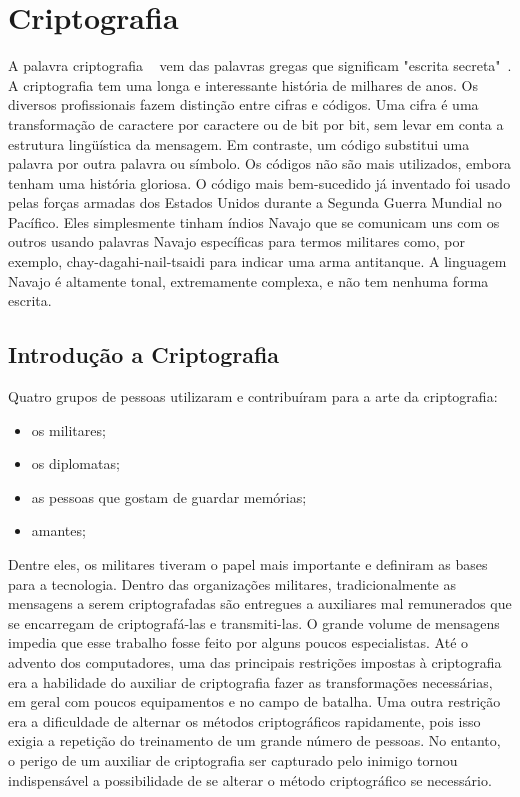 \chapter{Criptografia}


A palavra criptografia ~\cite{tanenbaum} vem das palavras gregas que significam "escrita secreta"~. A criptografia tem  uma longa e interessante história de milhares de anos. 
Os diversos  profissionais fazem distinção entre cifras e códigos. Uma cifra é uma transformação de caractere por caractere ou de bit por bit, sem levar em conta a estrutura lingüística da mensagem. Em contraste, um código substitui uma palavra por outra palavra ou símbolo. Os códigos não são mais utilizados, embora tenham uma história gloriosa. O código mais bem-sucedido já inventado foi usado pelas forças armadas dos Estados Unidos durante a Segunda Guerra Mundial no Pacífico. 
Eles simplesmente tinham índios Navajo que se comunicam uns com os outros usando palavras Navajo específicas para termos militares como, por exemplo, chay-dagahi-nail-tsaidi para indicar uma arma antitanque. A linguagem Navajo é altamente tonal, extremamente complexa, e não tem nenhuma forma escrita. 

\section{Introdução a Criptografia}

Quatro grupos de pessoas utilizaram e contribuíram para a arte da criptografia: 
\begin{itemize}
\item  os militares;
\item   os diplomatas; 
\item  as pessoas que gostam de guardar memórias;
\item  amantes;
\end{itemize}
Dentre eles, os militares tiveram o papel mais importante e definiram as bases para a tecnologia. Dentro das organizações militares, tradicionalmente as mensagens a serem criptografadas são entregues a auxiliares mal remunerados que se encarregam de criptografá-las e transmiti-las. O grande volume de mensagens impedia que esse trabalho fosse feito por alguns poucos especialistas. 
Até o advento dos computadores, uma das principais restrições impostas à criptografia era a 
habilidade do auxiliar de criptografia fazer as transformações necessárias, em geral com poucos equipamentos e no campo de batalha. Uma outra restrição era a dificuldade de alternar os métodos criptográficos rapidamente, pois isso exigia a repetição do treinamento de um grande número de pessoas. No entanto, o perigo de um auxiliar de criptografia ser capturado pelo inimigo tornou indispensável a possibilidade de se alterar o método criptográfico  se necessário.

